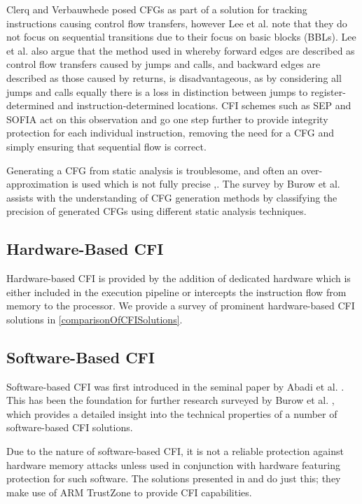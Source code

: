 Clerq and Verbauwhede \cite{DeClercq2017} posed CFGs as part of a solution for tracking instructions causing control flow transfers, however Lee et al. \cite{Lee2019} note that they do not focus on sequential transitions due to their focus on basic blocks (BBLs). Lee et al. also argue that the method used in \cite{DeClercq2017} whereby forward edges are described as control flow transfers caused by jumps and calls, and backward edges are described as those caused by returns, is disadvantageous, as by considering all jumps and calls equally there is a loss in distinction between jumps to register-determined and instruction-determined locations. CFI schemes such as SEP \cite{Lee2019} and SOFIA \cite{DeClercq2017b} act on this observation and go one step further to provide integrity protection for each individual instruction, removing the need for a CFG and simply ensuring that sequential flow is correct.

Generating a CFG from static analysis is troublesome, and often an over-approximation is used which is not fully precise \cite{Carlini2015},\cite{Kinder2012}. The survey by Burow et al. \cite{Burow} assists with the understanding of CFG generation methods by classifying the precision of generated CFGs using different static analysis techniques.

\subsection{Hardware-Based CFI}

Hardware-based CFI is provided by the addition of dedicated hardware which is either included in the execution pipeline or intercepts the instruction flow from memory to the processor. We provide a survey of prominent hardware-based CFI solutions in \ref{comparisonOfCFISolutions}.

\subsection{Software-Based CFI}

Software-based CFI was first introduced in the seminal paper by Abadi et al. \cite{Abadi2005}. This has been the foundation for further research surveyed by Burow et al. \cite{Burow}, which provides a detailed insight into the technical properties of a number of software-based CFI solutions.

Due to the nature of software-based CFI, it is not a reliable protection against hardware memory attacks unless used in conjunction with hardware featuring protection for such software. The solutions presented in \cite{Abera2016} and \cite{Nyman2017a} do just this; they make use of ARM TrustZone to provide CFI capabilities.

